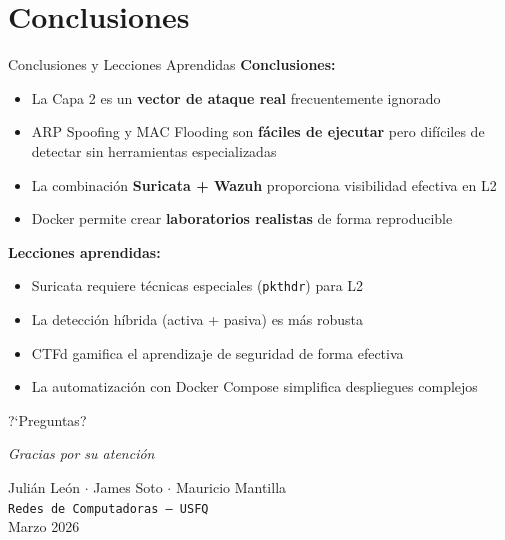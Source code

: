 \documentclass[aspectratio=169, 11pt]{beamer}
\begin{document}
\section{Conclusiones}

\begin{frame}{Conclusiones y Lecciones Aprendidas}
\textbf{Conclusiones:}
\begin{itemize}
    \item La Capa 2 es un \textbf{vector de ataque real} frecuentemente ignorado
    \item ARP Spoofing y MAC Flooding son \textbf{f\'aciles de ejecutar} pero dif\'iciles
          de detectar sin herramientas especializadas
    \item La combinaci\'on \textbf{Suricata + Wazuh} proporciona visibilidad efectiva en L2
    \item Docker permite crear \textbf{laboratorios realistas} de forma reproducible
\end{itemize}
\vspace{0.5em}
\textbf{Lecciones aprendidas:}
\begin{itemize}
    \item Suricata requiere t\'ecnicas especiales (\texttt{pkthdr}) para L2
    \item La detecci\'on h\'ibrida (activa + pasiva) es m\'as robusta
    \item CTFd gamifica el aprendizaje de seguridad de forma efectiva
    \item La automatizaci\'on con Docker Compose simplifica despliegues complejos
\end{itemize}
\end{frame}

\begin{frame}{}
\begin{center}
\Huge ?`Preguntas?

\vspace{1.5em}
\large \textit{Gracias por su atenci\'on}

\vspace{2em}
\normalsize
Juli\'an Le\'on $\cdot$ James Soto $\cdot$ Mauricio Mantilla\\[0.5em]
\texttt{Redes de Computadoras --- USFQ}\\[0.3em]
Marzo 2026
\end{center}
\end{frame}
\end{document}
